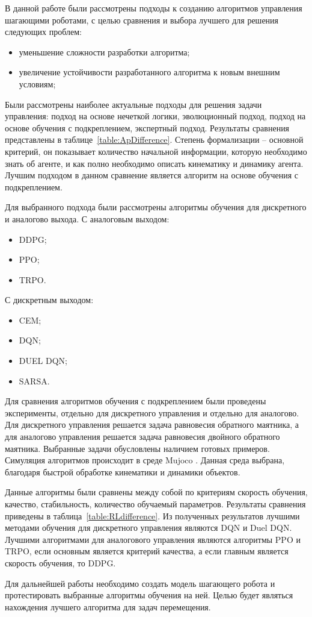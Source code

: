 В данной работе были рассмотрены подходы к созданию алгоритмов управления шагающими роботами, с целью сравнения и выбора лучшего для решения следующих проблем:
\begin{itemize}
	\item уменьшение сложности разработки алгоритма;
	\item увеличение устойчивости разработанного алгоритма к новым внешним условиям;
\end{itemize}

Были рассмотрены наиболее актуальные подходы для решения задачи управления: подход на основе нечеткой логики, эволюционный подход, подход на основе обучения с подкреплением, экспертный подход. 
Результаты сравнения представлены в \mbox{таблице \ref{table:ApDifference}.}
Степень формализации -- основной критерий, он показывает количество начальной информации, которую необходимо знать об агенте, и как полно необходимо описать кинематику и динамику агента.
Лучшим подходом в данном сравнение является алгоритм на основе обучения с подкреплением.

Для выбранного подхода были рассмотрены алгоритмы обучения для дискретного и аналогово выхода.
С аналоговым выходом:
\begin{itemize}
	\item DDPG;
	\item PPO;
	\item TRPO.
\end{itemize}

С дискретным выходом:
\begin{itemize}
	\item CEM;
	\item DQN;
	\item DUEL DQN;
	\item SARSA.
\end{itemize}

Для сравнения алгоритмов обучения с подкреплением были проведены эксперименты, отдельно для дискретного управления и отдельно для аналогово. 
Для дискретного управления решается задача равновесия обратного маятника, а для аналогово управления решается задача равновесия двойного обратного маятника. 
Выбранные задачи обусловлены наличием готовых примеров. 
Симуляция алгоритмов происходит в среде Mujoco \cite{mujoco}. Данная среда выбрана, благодаря быстрой обработке кинематики и динамики объектов.

Данные алгоритмы были сравнены между собой по критериям скорость обучения, качество, стабильность, количество обучаемый параметров.
Результаты сравнения приведены в \mbox{таблица \ref{table:RLdifference}.}
Из полученных результатов лучшими методами обучения для дискретного управления являются DQN и Duel DQN.
Лучшими алгоритмами для аналогового управления являются алгоритмы PPO и TRPO, если основным является критерий качества, а если главным является скорость обучения, то DDPG.

Для дальнейшей работы необходимо создать модель шагающего робота и протестировать выбранные алгоритмы обучения на ней. 
Целью будет являться нахождения лучшего алгоритма для задач перемещения.
\clearpage
